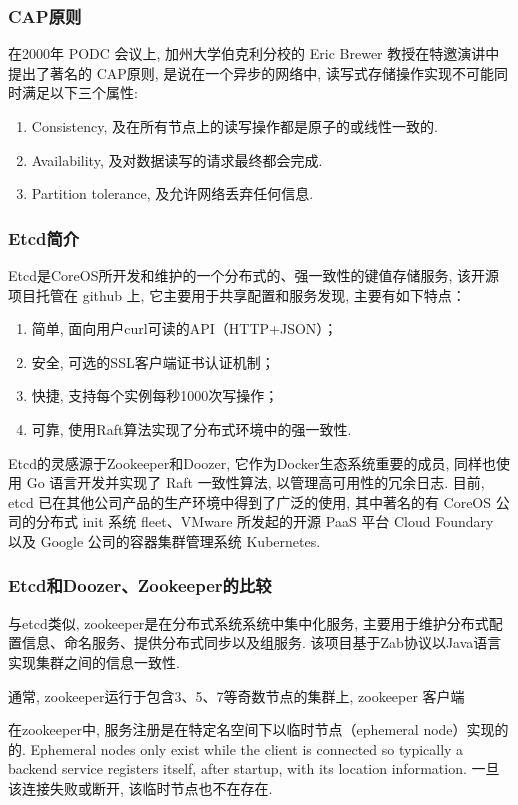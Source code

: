 \documentclass[UTF8,a4paper]{ctexart}
\begin{document}
\subsubsection{CAP原则}
在2000年 PODC 会议上, 加州大学伯克利分校的 Eric Brewer 教授在特邀演讲中提出了著名的 CAP原则\cite{CAP2000}, 是说在一个异步的网络中, 读写式存储操作实现不可能同时满足以下三个属性:
\begin{enumerate}
    \item Consistency, 及在所有节点上的读写操作都是原子的或线性一致的.
    \item Availability, 及对数据读写的请求最终都会完成.
    \item Partition tolerance, 及允许网络丢弃任何信息.
\end{enumerate}
\subsubsection{Etcd简介}
Etcd是CoreOS所开发和维护的一个分布式的、强一致性的键值存储服务, 该开源项目托管在 github 上, 它主要用于共享配置和服务发现, 主要有如下特点：
\begin{enumerate}
    \item 简单, 面向用户curl可读的API（HTTP+JSON）；
    \item 安全, 可选的SSL客户端证书认证机制；
    \item 快捷, 支持每个实例每秒1000次写操作；
    \item 可靠, 使用Raft算法实现了分布式环境中的强一致性.
\end{enumerate}

Etcd的灵感源于Zookeeper和Doozer, 它作为Docker生态系统重要的成员, 同样也使用 Go 语言开发并实现了 Raft \cite{Raft2014}一致性算法, 以管理高可用性的冗余日志. 目前, etcd 已在其他公司产品的生产环境中得到了广泛的使用, 其中著名的有 CoreOS 公司的分布式 init 系统 fleet、VMware 所发起的开源 PaaS 平台 Cloud Foundary 以及 Google 公司的容器集群管理系统 Kubernetes.

\subsubsection{Etcd和Doozer、Zookeeper的比较}
与etcd类似, zookeeper是在分布式系统系统中集中化服务, 主要用于维护分布式配置信息、命名服务、提供分布式同步以及组服务. 该项目基于Zab协议以Java语言实现集群之间的信息一致性.

通常, zookeeper运行于包含3、5、7等奇数节点的集群上, zookeeper 客户端

在zookeeper中, 服务注册是在特定名空间下以临时节点（ephemeral node）实现的的. Ephemeral nodes only exist while the client is connected so typically a backend service registers itself, after startup, with its location information. 一旦该连接失败或断开, 该临时节点也不在存在.
\end{document}
